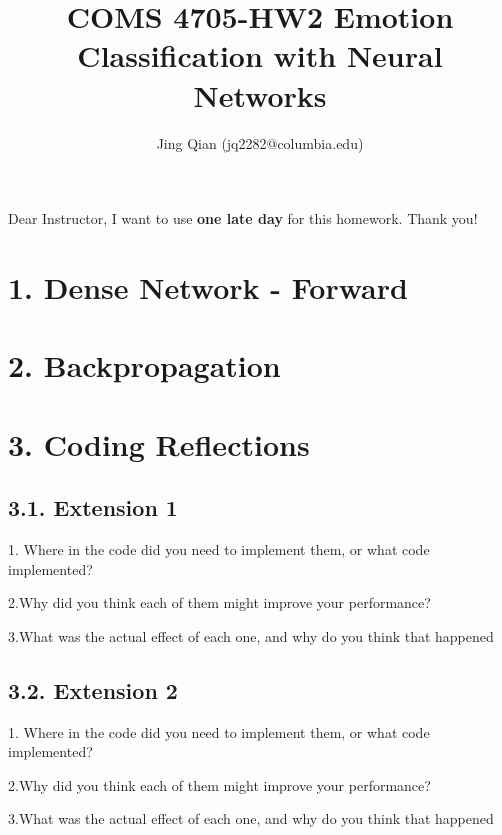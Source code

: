 \documentclass{article}
\title{COMS 4705-HW2 Emotion Classification with Neural Networks}
\author{Jing Qian (jq2282@columbia.edu)}
\begin{document}
\maketitle

Dear Instructor, I want to use \textbf{one late day} for this homework. Thank you!

\section*{1. Dense Network - Forward}

\section*{2. Backpropagation}

\section*{3. Coding Reflections}
\subsection*{3.1. Extension 1}
1. Where in the code did you need to implement them, or what code implemented?

2.Why did you think each of them might improve your performance? 

3.What was the actual effect of each one, and why do you think that happened

\subsection*{3.2. Extension 2}
1. Where in the code did you need to implement them, or what code implemented?

2.Why did you think each of them might improve your performance? 

3.What was the actual effect of each one, and why do you think that happened
\end{document}
